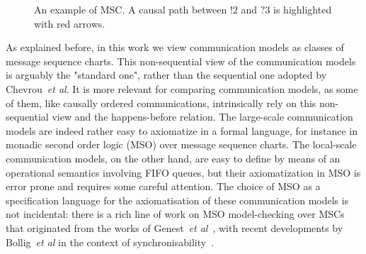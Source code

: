 
\begin{figure}[t]
	\begin{center}
		\caption{An example of MSC. A causal path between $!2$ and $?3$ is highlighted with red arrows.}
		\label{fig:msc_ex}
	\end{center}
\end{figure}


As explained before, in this work we view communication models as classes of message sequence charts.
This non-sequential view of the communication models is arguably the "standard one", 
rather than the sequential one adopted by Chevrou~\emph{et al}. It is more relevant for comparing communication models, as some
of them, like causally ordered communications, intrinsically rely on this non-sequential view and the happens-before relation. The
large-scale communication models are indeed rather easy to axiomatize in a formal language, for instance in monadic second order logic (MSO) over message sequence charts. The local-scale
communication models, on the other hand, are easy to define by means of an operational semantics involving FIFO queues, but their axiomatization
in MSO is error prone and requires some careful attention. The choice of MSO as a specification language for the axiomatisation of 
these communication models is not incidental: there is a rich line of work on MSO model-checking over MSCs that originated from
the works of Genest~\emph{et al}~\cite{genest2004kleene,GKM07}, with recent developments by Bollig~\emph{et al} in the context
of synchronisability~\cite{DBLP:conf/concur/BolligGFLLS21}.

